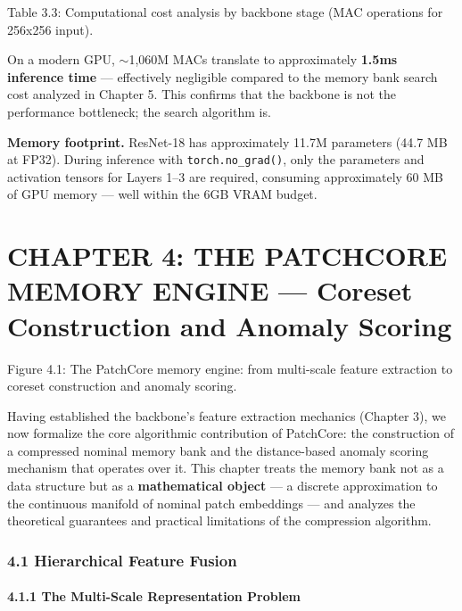 \documentclass[12pt, a4paper, oneside]{report}
\begin{document}
Table 3.3: Computational cost analysis by backbone stage (MAC operations for 256x256 input).

On a modern GPU, ${\sim}$1,060M MACs translate to approximately \textbf{1.5ms inference time} --- effectively negligible compared to the memory bank search cost analyzed in Chapter 5. This confirms that the backbone is not the performance bottleneck; the search algorithm is.

\textbf{Memory footprint.} ResNet-18 has approximately 11.7M parameters (44.7 MB at FP32). During inference with \texttt{torch.no\_grad()}, only the parameters and activation tensors for Layers 1--3 are required, consuming approximately 60 MB of GPU memory --- well within the 6GB VRAM budget.

\bigskip\noindent\hrulefill\bigskip

\chapter{CHAPTER 4: THE PATCHCORE MEMORY ENGINE --- Coreset Construction and Anomaly Scoring}\label{chapter-4-the-patchcore-memory-engine-coreset-construction-and-anomaly-scoring}

Figure 4.1: The PatchCore memory engine: from multi-scale feature extraction to coreset construction and anomaly scoring.

Having established the backbone's feature extraction mechanics (Chapter 3), we now formalize the core algorithmic contribution of PatchCore: the construction of a compressed nominal memory bank and the distance-based anomaly scoring mechanism that operates over it. This chapter treats the memory bank not as a data structure but as a \textbf{mathematical object} --- a discrete approximation to the continuous manifold of nominal patch embeddings --- and analyzes the theoretical guarantees and practical limitations of the compression algorithm.

\bigskip\noindent\hrulefill\bigskip

\subsection{4.1 Hierarchical Feature Fusion}\label{hierarchical-feature-fusion}

\subsubsection{4.1.1 The Multi-Scale Representation Problem}\label{the-multi-scale-representation-problem}
\end{document}
